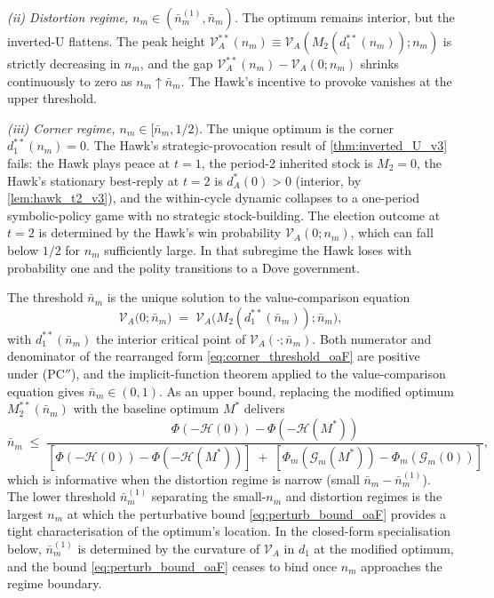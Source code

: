 \documentclass[11pt,twoside]{extarticle}
\begin{document}
\medskip\noindent\textit{(ii) Distortion regime, $n_m\in(\bar n_m^{(1)},\bar n_m)$.} The optimum remains interior, but the inverted-U flattens. The peak height $\mathcal V_A^{**}(n_m)\equiv\mathcal V_A(M_2(d_1^{**}(n_m));n_m)$ is strictly decreasing in $n_m$, and the gap $\mathcal V_A^{**}(n_m)-\mathcal V_A(0;n_m)$ shrinks continuously to zero as $n_m\uparrow\bar n_m$. The Hawk's incentive to provoke vanishes at the upper threshold.

\medskip\noindent\textit{(iii) Corner regime, $n_m\in[\bar n_m,1/2)$.} The unique optimum is the corner $d_1^{**}(n_m)=0$. The Hawk's strategic-provocation result of \autoref{thm:inverted_U_v3} fails: the Hawk plays peace at $t=1$, the period-2 inherited stock is $M_2=0$, the Hawk's stationary best-reply at $t=2$ is $d_A^{*}(0)>0$ (interior, by \autoref{lem:hawk_t2_v3}), and the within-cycle dynamic collapses to a one-period symbolic-policy game with no strategic stock-building. The election outcome at $t=2$ is determined by the Hawk's win probability $\mathcal V_A(0;n_m)$, which can fall below $1/2$ for $n_m$ sufficiently large. In that subregime the Hawk loses with probability one and the polity transitions to a Dove government.

The threshold $\bar n_m$ is the unique solution to the value-comparison equation
\begin{equation}\label{eq:nbar_oaF}
    \mathcal V_A\big(0;\bar n_m\big)\;=\;\mathcal V_A\big(M_2(d_1^{**}(\bar n_m));\bar n_m\big),
\end{equation}
with $d_1^{**}(\bar n_m)$ the interior critical point of $\mathcal V_A(\cdot;\bar n_m)$. Both numerator and denominator of the rearranged form \eqref{eq:corner_threshold_oaF} are positive under (PC$''$), and the implicit-function theorem applied to the value-comparison equation gives $\bar n_m\in(0,1)$. As an upper bound, replacing the modified optimum $M_2^{**}(\bar n_m)$ with the baseline optimum $M^{*}$ delivers
\begin{equation}\label{eq:nbar_upperbound_oaF}
    \bar n_m\;\le\;\frac{\Phi(-\mathcal H(0))-\Phi(-\mathcal H(M^{*}))}{[\Phi(-\mathcal H(0))-\Phi(-\mathcal H(M^{*}))]\;+\;[\Phi_m(\mathcal G_m(M^{*}))-\Phi_m(\mathcal G_m(0))]},
\end{equation}
which is informative when the distortion regime is narrow (small $\bar n_m-\bar n_m^{(1)}$). The lower threshold $\bar n_m^{(1)}$ separating the small-$n_m$ and distortion regimes is the largest $n_m$ at which the perturbative bound \eqref{eq:perturb_bound_oaF} provides a tight characterisation of the optimum's location. In the closed-form specialisation below, $\bar n_m^{(1)}$ is determined by the curvature of $\mathcal V_A$ in $d_1$ at the modified optimum, and the bound \eqref{eq:perturb_bound_oaF} ceases to bind once $n_m$ approaches the regime boundary.
\end{document}
